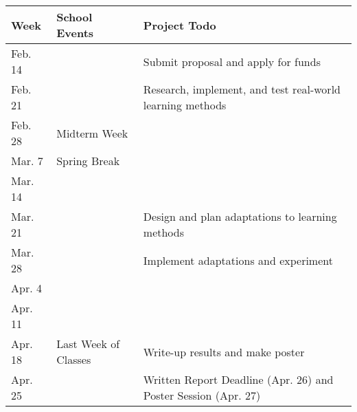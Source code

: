 \documentclass[10pt, letterpaper]{article}
\begin{document}
\begin{center}
	\begin{tabular}{ l l l }
		Week & School Events & Project Todo \\ \hline
		Feb. 14 & & Submit proposal and apply for funds \\
		Feb. 21 & & Research, implement, and test real-world learning methods \\
		Feb. 28 & Midterm Week & \\
		Mar. 7 & Spring Break & \\
		Mar. 14 & & \\
		Mar. 21 & & Design and plan adaptations to learning methods \\
		Mar. 28 & & Implement adaptations and experiment \\
		Apr. 4 & & \\
		Apr. 11 & & \\
		Apr. 18 & Last Week of Classes & Write-up results and make poster \\
		Apr. 25 & & Written Report Deadline (Apr. 26) and Poster Session (Apr. 27)
	\end{tabular} \\
\end{center}


\end{document}
